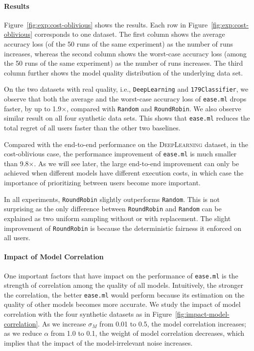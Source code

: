 \documentclass[letterpaper]{vldb}
\newcommand{\eml}{\texttt{ease.ml}\xspace}
\begin{document}
\paragraph*{Results}
Figure~\ref{fig:exp:cost-oblivious} shows the 
results. Each row in Figure~\ref{fig:exp:cost-oblivious} corresponds
to one dataset.
The first column shows the average accuracy loss (of the 50 runs of the same experiment) as the number of runs increases, whereas the second column shows the worst-case accuracy loss (among the 50 runs of the same experiment) as the number of runs increases.
The third column further shows the model quality distribution of the underlying data set.

On the two datasets with real
quality, i.e., \texttt{DeepLearning} and 
\texttt{179Classifier}, we observe that both the 
average and the worst-case accuracy loss of \eml 
drops faster, by up to 1.9$\times$,
compared with \texttt{Random} and 
\texttt{RoundRobin}. We also observe
similar result on all four synthetic data sets.
This shows that \eml reduces the total regret 
of all users faster than the other two baselines.

Compared with the end-to-end performance
on the \textsc{DeepLearning} dataset,
in the cost-oblivious case, the performance
improvement of \eml is much smaller than
9.8$\times$. As we will see later, the 
large end-to-end improvement can only be
achieved when different models have different
execution costs, in which case the importance
of prioritizing between users become
more important.

In all experiments, \texttt{RoundRobin} 
slightly outperforms \texttt{Random}. This is not 
surprising as the only difference
between \texttt{RoundRobin} and 
\texttt{Random} can be explained as two
uniform sampling without or with replacement.
The slight improvement of \texttt{RoundRobin} 
is because the deterministic 
fairness it enforced on all users.

\paragraph*{Impact of Model Correlation}

One important factors that have impact on
the performance of \eml is the strength
of correlation among the quality of all models.
Intuitively, the stronger the correlation,
the better \eml would perform because its
estimation on the quality of other models
becomes more accurate. We study the
impact of model correlation with the
four synthetic datasets
as in Figure~\ref{fig:impact-model-correlation}.
As we increase $\sigma_M$ from 0.01 to 0.5, the 
model correlation increases; as we reduce $\alpha$ from 1.0 to 0.1, the weight of model correlation decreases, which implies that the impact of the model-irrelevant noise increases.
\end{document}
